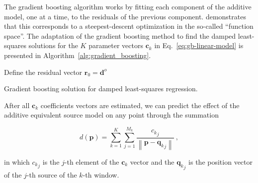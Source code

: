 The gradient boosting algorithm works by fitting each component of the
additive model, one at a time, to the residuals of the previous component.
\citet{friedman2001} demonstrates that this corresponds to a steepest-descent
optimization in the so-called ``function space''.
The adaptation of the gradient boosting method to find the damped least-squares
solutions for the $K$ parameter vectors $\mathbf{c}_k$ in
Eq.~\ref{eq:gb-linear-model} is presented in
Algorithm~\ref{alg:gradient_boosting}.

\begin{algorithm}[!h]
  \DontPrintSemicolon
  Define the residual vector $\mathbf{r}_{0} = \mathbf{d}^o$ \;
  \BlankLine
  \caption{Gradient boosting solution for damped least-squares regression.}
  \label{alg:gradient_boosting}
\end{algorithm}

After all $\mathbf{c}_k$ coefficients vectors are estimated, we can predict the
effect of the additive equivalent source model on any point through the
summation

\begin{equation}
    d(\mathbf{p}) =
    \sum\limits_{k=1}^K \sum\limits_{j=1}^{M_k}
    \frac{{c_k}_j}{\left\lVert \mathbf{p} - {\mathbf{q}_k}_j \right\rVert}
    \ ,
    \label{eq:eql-forward-gb}
\end{equation}

\noindent
in which ${c_k}_j$ is the $j$-th element of the $\mathbf{c}_k$ vector and the
${\mathbf{q}_k}_j$ is the position vector of the $j$-th source of the $k$-th
window.

